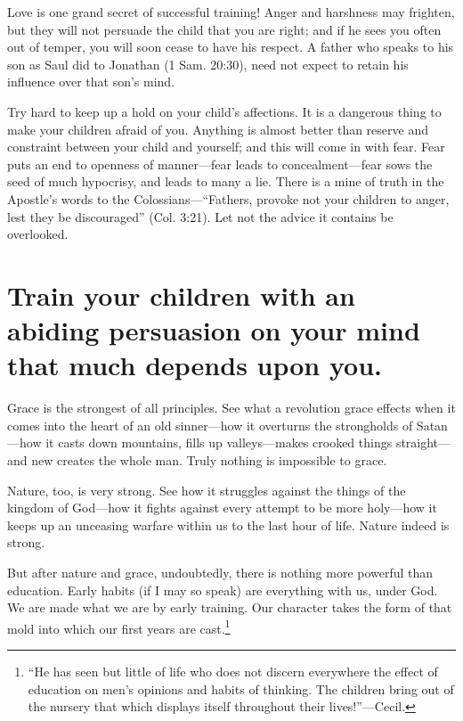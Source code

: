 \documentclass[
]{book}
\begin{document}
Love is one grand secret of successful training! Anger and harshness may frighten, but they will not persuade the child that you are right; and if he sees you often out of temper, you will soon cease to have his respect. A father who speaks to his son as Saul did to Jonathan (1 Sam. 20:30), need not expect to retain his influence over that son's mind.

Try hard to keep up a hold on your child's affections. It is a dangerous thing to make your children afraid of you. Anything is almost better than reserve and constraint between your child and yourself; and this will come in with fear. Fear puts an end to openness of manner---fear leads to concealment---fear sows the seed of much hypocrisy, and leads to many a lie. There is a mine of truth in the Apostle's words to the Colossians---``Fathers, provoke not your children to anger, lest they be discouraged'' (Col. 3:21). Let not the advice it contains be overlooked.

\hypertarget{train-your-children-with-an-abiding-persuasion-on-your-mind-that-much-depends-upon-you.}{%
\chapter{Train your children with an abiding persuasion on your mind that much depends upon you.}\label{train-your-children-with-an-abiding-persuasion-on-your-mind-that-much-depends-upon-you.}}

Grace is the strongest of all principles. See what a revolution grace effects when it comes into the heart of an old sinner---how it overturns the strongholds of Satan---how it casts down mountains, fills up valleys---makes crooked things straight---and new creates the whole man. Truly nothing is impossible to grace.

Nature, too, is very strong. See how it struggles against the things of the kingdom of God---how it fights against every attempt to be more holy---how it keeps up an unceasing warfare within us to the last hour of life. Nature indeed is strong.

But after nature and grace, undoubtedly, there is nothing more powerful than education. Early habits (if I may so speak) are everything with us, under God. We are made what we are by early training. Our character takes the form of that mold into which our first years are cast.\footnote{``He has seen but little of life who does not discern everywhere the effect of education on men's opinions and habits of thinking. The children bring out of the nursery that which displays itself throughout their lives!''---Cecil.}
\end{document}
